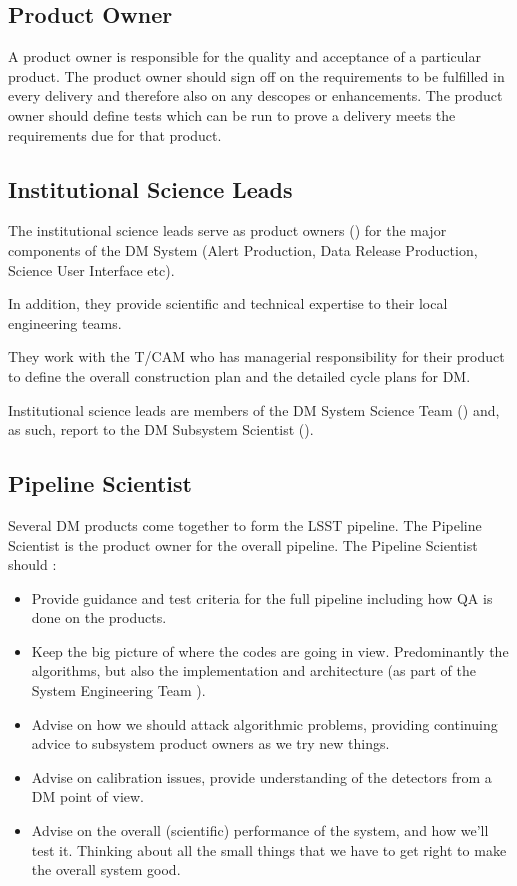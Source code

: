 \subsection{Product Owner \label{role:prodo}}

A product owner is responsible for the quality and acceptance of a particular product.
The product owner should sign off on the requirements to be fulfilled in every delivery and therefore also on any descopes or enhancements.
The product owner should define tests which can be run to prove a delivery meets the requirements due for that product.

\subsection{Institutional Science Leads \label{role:scilead}}

The institutional science leads serve as product owners () for the major components of the DM System (Alert Production, Data Release Production, Science User Interface etc).

In addition, they provide scientific and technical expertise to their local engineering teams.

They work with the T/CAM who has managerial responsibility for their product to define the overall construction plan and the detailed cycle plans for DM.

Institutional science leads are members of the DM System Science Team () and, as such, report to the DM Subsystem Scientist ().

\subsection{Pipeline Scientist \label{role:pipe}}

Several DM products come together to form the LSST pipeline. The Pipeline Scientist is the product owner for the overall pipeline. 
The Pipeline Scientist should :
\begin{itemize}
\item  Provide guidance and test criteria for the full pipeline including how QA is done on the products.  
\item Keep the big picture of where the codes are going in view. Predominantly the algorithms, but also the implementation and architecture (as part of the System Engineering Team ).


\item Advise on how we should attack algorithmic problems,  
providing continuing advice to subsystem product owners as we try new things. 

\item Advise on calibration issues, provide understanding of the detectors from a DM point of view. 

\item Advise on the overall (scientific) performance of the system, and how we'll test it.  Thinking about all the small things that we have to get right to make the overall system good.



\end{itemize}



